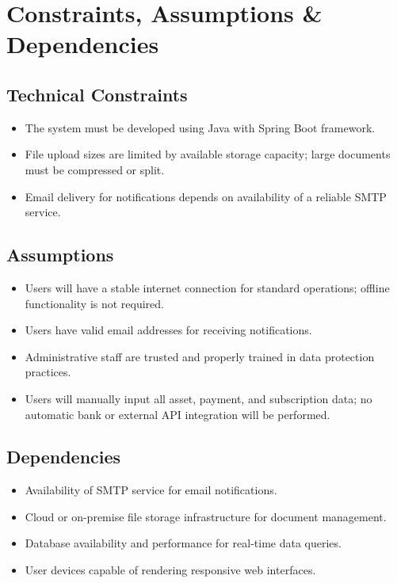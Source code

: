 \documentclass[11pt, a4paper]{article}
\begin{document}
\section{Constraints, Assumptions \& Dependencies}

\subsection{Technical Constraints}
\begin{itemize}
	\item The system must be developed using Java with Spring Boot framework.
	\item File upload sizes are limited by available storage capacity; large documents must be compressed or split.
	\item Email delivery for notifications depends on availability of a reliable SMTP service.
\end{itemize}

\subsection{Assumptions}
\begin{itemize}
	\item Users will have a stable internet connection for standard operations; offline functionality is not required.
	\item Users have valid email addresses for receiving notifications.
	\item Administrative staff are trusted and properly trained in data protection practices.
	\item Users will manually input all asset, payment, and subscription data; no automatic bank or external API integration will be performed.
\end{itemize}

\subsection{Dependencies}
\begin{itemize}
	\item Availability of SMTP service for email notifications.
	\item Cloud or on-premise file storage infrastructure for document management.
	\item Database availability and performance for real-time data queries.
	\item User devices capable of rendering responsive web interfaces.
\end{itemize}
\end{document}
